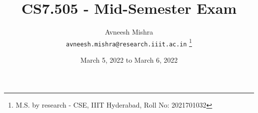 

{
   \fancyhf{}
   \renewcommand{\headrulewidth}{0pt} %
}

\title{CS7.505 - Mid-Semester Exam}

\author{
    Avneesh Mishra \\
    \texttt{avneesh.mishra@research.iiit.ac.in}
    \thanks{M.S. by research - CSE, IIIT Hyderabad, Roll No: 2021701032}
}

\date{March 5, 2022 to March 6, 2022}


    \maketitle
    \thispagestyle{fancy_tr_rno}
    \tableofcontents
    \pagebreak
    
    \pagebreak
    
    
    \pagebreak
    \printbibliography

